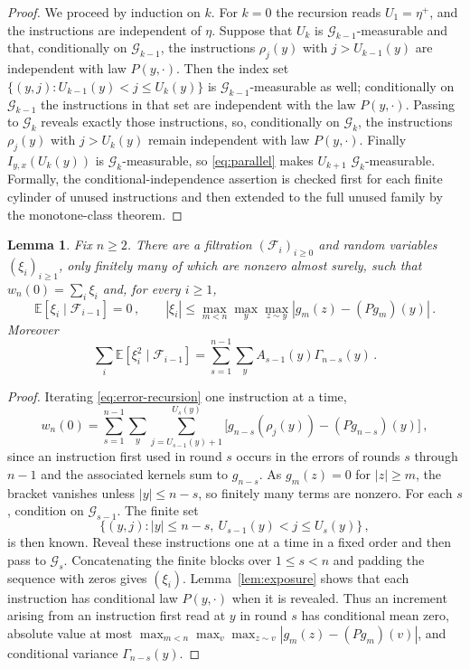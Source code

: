 \documentclass[11pt]{amsart}
\theoremstyle{plain}
\newtheorem{lemma}[theorem]{Lemma}
\theoremstyle{definition}
\newcommand{\E}{\mathbb{E}}
\begin{document}
\begin{proof}
	We proceed by induction on $k$. For $k=0$ the recursion reads $U_1=\eta^+$, and the
	instructions are independent of $\eta$. Suppose that $U_k$ is
	$\mathcal G_{k-1}$-measurable and that, conditionally on
	$\mathcal G_{k-1}$, the instructions $\rho_j(y)$ with
	$j>U_{k-1}(y)$ are independent with law $P(y,\cdot)$. Then the index set
	$\{(y,j):U_{k-1}(y)<j\leq U_k(y)\}$ is $\mathcal G_{k-1}$-measurable as well; conditionally on
	$\mathcal G_{k-1}$ the instructions in that set are independent with the
	law $P(y,\cdot)$. Passing to $\mathcal G_k$ reveals exactly those
	instructions, so, conditionally on $\mathcal G_k$, the instructions
	$\rho_j(y)$ with $j>U_k(y)$ remain independent with law $P(y,\cdot)$.
	Finally $I_{y,x}(U_k(y))$ is $\mathcal G_k$-measurable, so
	\eqref{eq:parallel} makes $U_{k+1}$ $\mathcal G_k$-measurable.
	Formally, the conditional-independence assertion is checked first for each finite cylinder
	of unused instructions and then extended to the full unused family by the
	monotone-class theorem.
\end{proof}

\begin{lemma}\label{lem:w-martingale}
	Fix $n\geq2$. There are a filtration $(\mathcal F_i)_{i\geq0}$ and random
	variables $(\xi_i)_{i\geq1}$, only finitely many of which are nonzero almost
	surely, such that $w_n(0)=\sum_i\xi_i$ and, for every $i\geq1$,
	\[
		\E[\xi_i\mid\mathcal F_{i-1}]=0\,,\qquad
		|\xi_i|\leq\max_{m<n}\max_y\max_{z\sim y}|g_m(z)-(Pg_m)(y)|\,.
	\]
	Moreover
	\begin{equation}\label{eq:qv}
		\sum_i\E[\xi_i^2\mid\mathcal F_{i-1}]
		=\sum_{s=1}^{n-1}\sum_yA_{s-1}(y)\Gamma_{n-s}(y)\,.
	\end{equation}
\end{lemma}

\begin{proof}
	Iterating \eqref{eq:error-recursion} one instruction at a time,
	\[
		w_n(0)=\sum_{s=1}^{n-1}\sum_y\sum_{j=U_{s-1}(y)+1}^{U_s(y)}
		\bigl[g_{n-s}(\rho_j(y))-(Pg_{n-s})(y)\bigr]\,,
	\]
	since an instruction first used in round $s$ occurs in the errors of rounds
	$s$ through $n-1$ and the associated kernels sum to $g_{n-s}$. As
	$g_m(z)=0$ for $|z|\geq m$, the bracket vanishes unless $|y|\leq n-s$, so
	finitely many terms are nonzero. For each $s$, condition on
	$\mathcal G_{s-1}$. The finite set
	\[
		\{(y,j):|y|\leq n-s,\ U_{s-1}(y)<j\leq U_s(y)\}\,,
	\]
	is then known. Reveal these instructions one at a time in a fixed order and
	then pass to $\mathcal G_s$. Concatenating the finite blocks over
	$1\leq s<n$ and padding the sequence with zeros gives $(\xi_i)$.
	Lemma~\ref{lem:exposure} shows that each instruction has conditional law
	$P(y,\cdot)$ when it is revealed. Thus an increment arising from an
	instruction first read at $y$ in round $s$ has conditional mean zero,
	absolute value at most
	$\max_{m<n}\max_v\max_{z\sim v}|g_m(z)-(Pg_m)(v)|$, and conditional variance
	$\Gamma_{n-s}(y)$.
\end{proof}
\end{document}
